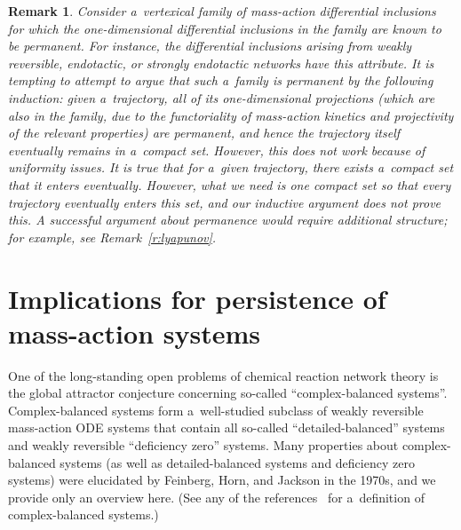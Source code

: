 \documentclass[pdftex]{sigma}
\newtheorem{Remark}[Theorem]{Remark}
\begin{document}
\begin{Remark}
Consider a~vertexical family of mass-action dif\/ferential inclusions for which the one-dimensional dif\/ferential
inclusions in the family are known to be permanent.
For instance, the dif\/ferential inclusions arising from weakly reversible, endotactic, or strongly endotactic networks
have this attribute.
It is tempting to attempt to argue that such a~family is permanent by the following induction: given a~trajectory, all
of its one-dimensional projections (which are also in the family, due to the functoriality of mass-action kinetics and
projectivity of the relevant properties) are permanent, and hence the trajectory itself eventually remains in a~compact
set.
However, this does not work because of uniformity issues.
It is true that for a~given trajectory, there exists a~compact set that it enters eventually.
However, what we need is one compact set so that every trajectory eventually enters this set, and our inductive
argument does not prove this.
A successful argument about permanence would require additional structure; for example, see Remark~\ref{r:lyapunov}.
\end{Remark}

\section{Implications for persistence of mass-action systems}
\label{sec:implications}

One of the long-standing open problems of chemical reaction network  theory is the global attractor conjecture
concerning so-called ``complex-balanced systems''.
Complex-balanced systems form a~well-studied subclass of weakly reversible mass-action ODE systems that contain all
so-called ``detailed-balanced'' systems and weakly reversible ``def\/iciency zero'' systems.
Many properties about complex-balanced systems (as well as detailed-balanced systems and def\/iciency zero systems)
were elucidated by Feinberg, Horn, and Jackson in the 1970s, and we provide only an overview here.
(See any of the references~\cite{TDS,Feinberg72,Fein79,HornJackson} for a~def\/inition of complex-balanced systems.)
\end{document}
